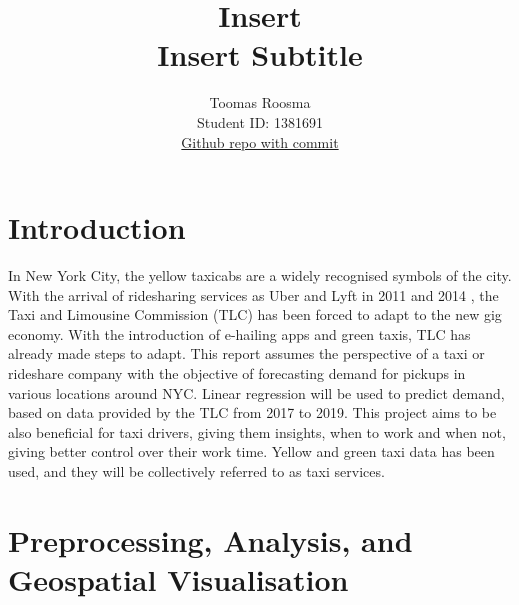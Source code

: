 \documentclass[11pt]{article}
\title{\textbf{Insert} \\ Insert Subtitle}
\author{
Toomas Roosma \\
Student ID: 1381691 \\
\href{https://github.com/MAST30034-Applied-Data-Science/mast30034-project-1-ToomasRo/commit/68eb95dd343f163fd64bdcbf79bc71494db85056}{Github repo with commit}
}
\begin{document}
\maketitle

\section{Introduction}
In  New York City, the yellow taxicabs are a widely recognised symbols of the city. 
With the arrival of ridesharing services as Uber and Lyft in 2011 \cite{uberStartDate} and 2014 \cite{lyftStartDate} , the Taxi and Limousine Commission (TLC) has been forced to adapt to the new 
gig economy. With the introduction of e-hailing apps and green taxis, TLC has already made steps to adapt. This report
assumes the perspective of a taxi or rideshare company with the objective of forecasting demand for pickups in various locations around NYC.
Linear regression will be used to predict demand, based on data provided by the TLC from 2017 to 2019. This project aims to be also beneficial for taxi drivers, giving them insights, when to work and when not, giving better control over their work time. Yellow and green taxi data has been used, and they will be collectively referred to as taxi services.

\section{Preprocessing, Analysis, and Geospatial Visualisation}
\end{document}
